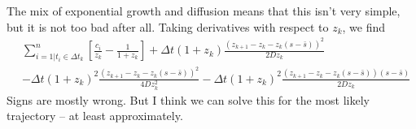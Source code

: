 \documentclass[11pt]{article}
\begin{document}
The mix of exponential growth and diffusion means that this isn't very simple, but it 
is not too bad after all. Taking derivatives with respect to $z_k$, we find
\begin{equation}
\begin{split}
    &\sum_{i=1 | t_i \in \Delta t_k}^n \left[\frac{c_i}{z_k} - \frac{1}{1+z_k}\right] +\Delta t (1+z_k)\frac{(z_{k+1}-z_k-z_k(s-\bar{s}))^2}{2Dz_k}\\
    &-\Delta t (1+z_k)^2\frac{(z_{k+1}-z_k-z_k(s-\bar{s}))^2}{4Dz_k^2} -\Delta t (1+z_k)^2\frac{(z_{k+1}-z_k-z_k(s-\bar{s}))(s-\bar{s})}{2Dz_k}  
\end{split}
\end{equation}
Signs are mostly wrong. But I think we can solve this for the most likely trajectory -- at least approximately.
\end{document}
